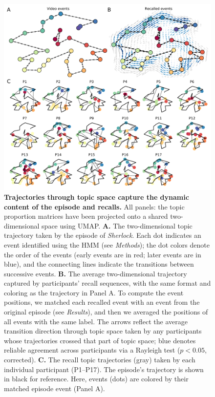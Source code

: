 \documentclass{article}
\begin{document}
\begin{figure}[tp]
\centering
\includegraphics[width=1\textwidth]{figs/trajectory}
\caption{\small \textbf{Trajectories through topic space capture the dynamic content of the episode and recalls.}  All panels: the topic proportion matrices have been projected onto a shared two-dimensional space using UMAP.  \textbf{A.} The two-dimensional topic trajectory taken by the episode of \textit{Sherlock}.  Each dot indicates an event identified using the HMM (see \textit{Methods}); the dot colors denote the order of the events (early events are in red; later events are in blue), and the connecting lines indicate the transitions between successive events.  \textbf{B.} The average two-dimensional trajectory captured by participants' recall sequences, with the same format and coloring as the trajectory in Panel A.  To compute the event positions, we matched each recalled event with an event from the original episode (see \textit{Results}), and then we averaged the positions of all events with the same label.  The arrows reflect the average transition direction through topic space taken by any participants whose trajectories crossed that part of topic space; blue denotes reliable agreement across participants via a Rayleigh test ($p < 0.05$, corrected).  \textbf{C.} The recall topic trajectories (gray) taken by each individual participant (P1--P17).  The episode's trajectory is shown in black for reference.  Here, events (dots) are colored by their matched episode event (Panel A).}
\label{fig:trajectory}
\end{figure}
\end{document}
